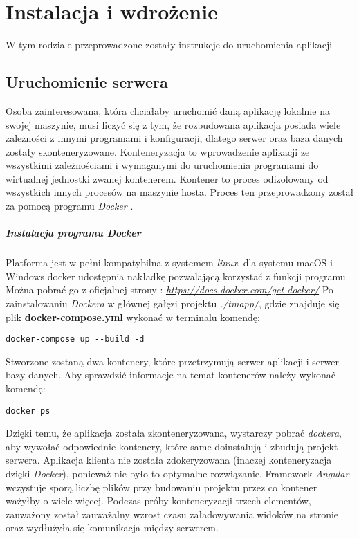 \chapter{Instalacja i wdrożenie}
\thispagestyle{chapterBeginStyle}
W tym rodziale przeprowadzone zostały instrukcje do uruchomienia aplikacji
\section{Uruchomienie serwera}
 Osoba zainteresowana, która chciałaby uruchomić daną aplikację lokalnie na swojej maszynie, musi liczyć się z tym, że rozbudowana aplikacja posiada wiele zależności z innymi programami i konfiguracji, dlatego serwer oraz baza danych zostały skonteneryzowane.  Konteneryzacja to wprowadzenie aplikacji ze wszystkimi zależnościami i wymaganymi do uruchomienia programami do wirtualnej jednostki zwanej kontenerem. Kontener to proces odizolowany od wszystkich innych procesów na maszynie hosta. Proces ten przeprowadzony został za pomocą programu \textit{Docker} \cite{docker}. 
 \paragraph{Instalacja programu Docker} 
 Platforma jest w pełni kompatybilna z systemem \textit{linux}, dla systemu \linebreak macOS i Windows docker udostępnia nakładkę pozwalającą korzystać z funkcji programu. Można pobrać go z oficjalnej strony :  \textit{\url{https://docs.docker.com/get-docker/}} 
 Po zainstalowaniu \textit{Dockera} w głównej gałęzi projektu \textit{./tmapp/}, gdzie znajduje się plik \textbf{docker-compose.yml}  wykonać w terminalu komendę:
 
 \begin{lstlisting}
docker-compose up --build -d
 \end{lstlisting}


Stworzone zostaną dwa kontenery, które przetrzymują serwer aplikacji i serwer bazy danych. Aby sprawdzić informacje na temat kontenerów należy wykonać komendę:
 
 \begin{lstlisting}
docker ps
\end{lstlisting}

Dzięki temu, że aplikacja została zkonteneryzowana, wystarczy pobrać \textit{dockera}, aby wywołać odpowiednie kontenery, które same doinstalują i zbudują projekt serwera. Aplikacja klienta nie została zdokeryzowana (inaczej konteneryzacja dzięki \textit{Docker}), ponieważ nie było to optymalne rozwiązanie. Framework \textit{Angular} wczystuje sporą liczbę plików przy budowaniu projektu przez co kontener ważyłby o wiele więcej. Podczas próby konteneryzacji trzech elementów, zauważony został zauważalny wzrost czasu załadowywania widoków na stronie oraz wydłużyła się komunikacja między serwerem.
\clearpage
